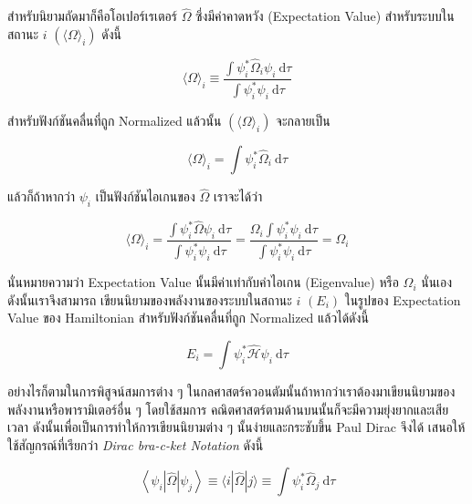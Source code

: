 สำหรับนิยามถัดมาก็คือโอเปอร์เรเตอร์ $\hat{\Omega}$ ซึ่งมีค่าคาดหวัง (Expectation Value) สำหรับระบบในสถานะ $i$
$(\langle\Omega\rangle_i)$ ดังนี้

\begin{equation}
    \langle\Omega\rangle_i
    \equiv
    \frac
    {
        \int \psi_i^* \hat{\Omega}_i \psi_i \mathrm{~d} \tau
    }
    {
        \int \psi_i^* \psi_i \mathrm{~d} \tau
    }
\end{equation}

\noindent สำหรับฟังก์ชันคลื่นที่ถูก Normalized แล้วนั้น $(\langle\Omega\rangle_i)$ จะกลายเป็น

\begin{equation}
    \langle\Omega\rangle_i = \int \psi_i^* \hat{\Omega}_i \mathrm{~d} \tau
\end{equation}

แล้วก็ถ้าหากว่า $\psi_i$ เป็นฟังก์ชันไอเกนของ $\hat{\Omega}$ เราจะได้ว่า

\begin{equation}
    \langle\Omega\rangle_i
    = \frac
    {
        \int \psi_i^* \hat{\Omega} \psi_i \mathrm{~d} \tau
    }
    {
        \int \psi_i^* \psi_i \mathrm{~d} \tau
    }
    = \frac
    {
        \Omega_i \int \psi_i^* \psi_i \mathrm{~d} \tau
    }
    {
        \int \psi_i^* \psi_i \mathrm{~d} \tau
    }
    = \Omega_i
\end{equation}

\noindent นั่นหมายความว่า Expectation Value นั้นมีค่าเท่ากับค่าไอเกน (Eigenvalue) หรือ $\Omega_i$ นั่นเอง ดังนั้นเราจึงสามารถ%
เขียนนิยามของพลังงานของระบบในสถานะ $i$ $(E_i)$ ในรูปของ Expectation Value ของ Hamiltonian สำหรับฟังก์ชันคลื่นที่ถูก
Normalized แล้วได้ดังนี้

\begin{equation}
    E_i = \int \psi_i^* \hat{\mathcal{H}} \psi_i \mathrm{~d} \tau
\end{equation}

อย่างไรก็ตามในการพิสูจน์สมการต่าง ๆ ในกลศาสตร์ควอนตัมนั้นถ้าหากว่าเราต้องมาเขียนนิยามของพลังงานหรือพารามิเตอร์อื่น ๆ โดยใช้สมการ%
คณิตศาสตร์ตามด้านบนนั้นก็จะมีความยุ่งยากและเสียเวลา ดังนั้นเพื่อเป็นการทำให้การเขียนนิยามต่าง ๆ นั้นง่ายและกระชับขึ้น Paul Dirac จึงได้%
เสนอให้ใช้สัญกรณ์ที่เรียกว่า \textit{Dirac bra-c-ket Notation} ดังนี้

\begin{equation}
    \left\langle\psi_i|\hat{\Omega}| \psi_j\right\rangle
    \equiv
    \langle i|\hat{\Omega}| j\rangle
    \equiv
    \int \psi_i^* \hat{\Omega}_j \mathrm{~d} \tau
\end{equation}

